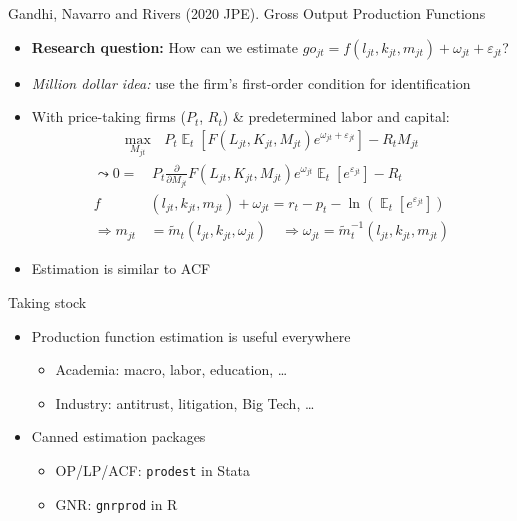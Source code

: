 \documentclass[aspectratio=169,compress,t,xcolor=table]{beamer}
\DeclareMathOperator{\E}{\mathbb{E}}                       %
\begin{document}
\begin{frame}{}
Gandhi, Navarro and Rivers (2020 JPE). Gross Output Production Functions 
  \begin{itemize}
    \item {\color{MyStructure}\textbf{Research question:}} How can we estimate \(go_{jt} = f(l_{jt}, k_{jt}, m_{jt}) + \omega_{jt} + \varepsilon_{jt}\)?
    \vfill\item {\color{MyStructure}\textit{Million dollar idea:}} use the firm's first-order condition for identification
    \vfill\item With price-taking firms (\(P_t\), \(R_t\)) \& predetermined labor and capital:
    \begin{align*}
      \max_{M_{jt}} &\, P_t \E_t [F(L_{jt}, K_{jt}, M_{jt}) e^{\omega_{jt} + \varepsilon_{jt}}] - R_t M_{jt}
    \end{align*}
    \pause
    \begin{align*}
      \leadsto 0 =&\, P_t \frac{\partial}{\partial M_{jt}} F(L_{jt}, K_{jt}, M_{jt}) e^{\omega_{jt}} \E_t [e^{\varepsilon_{jt}}] - R_t \\
      f&(l_{jt}, k_{jt}, m_{jt}) + \omega_{jt} = r_t - p_t - \ln (\E_t [e^{\varepsilon_{jt}}]) \\
      \Rightarrow m_{jt} &= \tilde{m}_t (l_{jt}, k_{jt}, \omega_{jt}) \quad \Rightarrow \omega_{jt} = \tilde{m}^{-1}_t (l_{jt}, k_{jt}, m_{jt})
    \end{align*}
    \vfill\item Estimation is similar to ACF
  \end{itemize}
\end{frame}

\begin{frame}{Taking stock}
  \begin{itemize}
    \vfill\item Production function estimation is useful everywhere
    \begin{itemize}
      \vfill\item Academia: macro, labor, education, \ldots
      \vfill\item Industry: antitrust, litigation, Big Tech, \ldots
    \end{itemize}
    \vfill\item Canned estimation packages
    \begin{itemize}
      \vfill\item OP/LP/ACF: \texttt{prodest} in Stata
      \vfill\item GNR: \texttt{gnrprod} in R
    \end{itemize}
  \end{itemize}
\end{frame}
\end{document}
